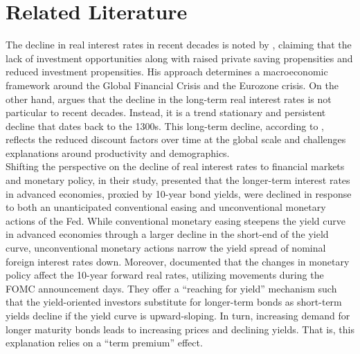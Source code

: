 \section{Related Literature}

The decline in real interest rates in recent decades is noted by \citet{summers2014reflections}, claiming that the lack of investment opportunities along with raised private saving propensities and reduced investment propensities. His approach determines a macroeconomic framework around the Global Financial Crisis and the Eurozone crisis. On the other hand, \citet{rogoff2022} argues that the decline in the long-term real interest rates is not particular to recent decades. Instead, it is a trend stationary and persistent decline that dates back to the 1300s. This long-term decline, according to \citet{rogoff2022}, reflects the reduced discount factors over time at the global scale and challenges explanations around productivity and demographics. \\

Shifting the perspective on the decline of real interest rates to financial markets and monetary policy, in their study, \citet{gilchrist2014us} presented that the longer-term interest rates in advanced economies, proxied by 10-year bond yields, were declined in response to both an unanticipated conventional easing and unconventional monetary actions of the Fed. While conventional monetary easing steepens the yield curve in advanced economies through a larger decline in the short-end of the yield curve, unconventional monetary actions narrow the yield spread of nominal foreign interest rates down. Moreover, \citet{hanson2015monetary} documented that the changes in monetary policy affect the 10-year forward real rates, utilizing movements during the FOMC announcement days. They offer a ``reaching for yield'' mechanism such that the yield-oriented investors substitute for longer-term bonds as short-term yields decline if the yield curve is upward-sloping. In turn, increasing demand for longer maturity bonds leads to increasing prices and declining yields. That is, this explanation relies on a ``term premium'' effect. \citep{hanson2015monetary}\\



